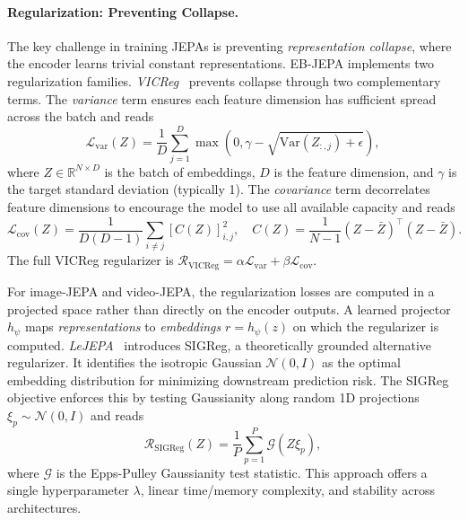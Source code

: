 \documentclass{article}
\begin{document}
\paragraph{Regularization: Preventing Collapse.}
\label{sec:regularization}
The key challenge in training JEPAs is preventing \textit{representation collapse}, where the encoder learns trivial constant representations.
EB-JEPA implements two regularization families.
\textit{VICReg}~\citep{VICReg} prevents collapse through two complementary terms.
The \textit{variance} term ensures each feature dimension has sufficient spread across the batch and reads
\begin{equation}
\mathcal{L}_{\text{var}}(Z) = \frac{1}{D} \sum_{j=1}^{D} \max\left(0, \gamma - \sqrt{\text{Var}(Z_{:,j}) + \epsilon}\right),
\end{equation}
where $Z \in \mathbb{R}^{N \times D}$ is the batch of embeddings, $D$ is the feature dimension, and $\gamma$ is the target standard deviation (typically 1).
The \textit{covariance} term decorrelates feature dimensions to encourage the model to use all available capacity and reads
\begin{equation}
\mathcal{L}_{\text{cov}}(Z) = \frac{1}{D(D-1)} \sum_{i \neq j} [C(Z)]^2_{i,j}, \quad C(Z) = \frac{1}{N-1}(Z - \bar{Z})^\top(Z - \bar{Z}).
\end{equation}
The full VICReg regularizer is $\mathcal{R}_{\text{VICReg}} = \alpha \mathcal{L}_{\text{var}} + \beta \mathcal{L}_{\text{cov}}$.

For image-JEPA and video-JEPA, the regularization losses are computed in a projected space rather than directly on the encoder outputs.
A learned projector $h_\psi$ maps \emph{representations} to \emph{embeddings} $r = h_\psi(z)$ on which the regularizer is computed.
\textit{LeJEPA}~\citep{balestriero2025lejepaprovablescalableselfsupervised} introduces SIGReg, a theoretically grounded alternative regularizer.
It identifies the isotropic Gaussian $\mathcal{N}(0, I)$ as the optimal embedding distribution for minimizing downstream prediction risk.
The SIGReg objective enforces this by testing Gaussianity along random 1D projections $\xi_p \sim \mathcal{N}(0, I)$ and reads
\begin{equation}\label{eq:SIGReg}
\mathcal{R}_{\text{SIGReg}}(Z) = \frac{1}{P}\sum_{p=1}^{P} \mathcal{G}(Z \xi_p),
\end{equation}
where $\mathcal{G}$ is the Epps-Pulley Gaussianity test statistic.
This approach offers a single hyperparameter $\lambda$, linear time/memory complexity, and stability across architectures.
\end{document}
